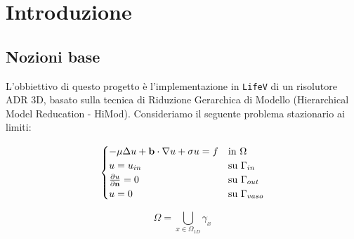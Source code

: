\chapter{Introduzione}
\section{Nozioni base}

L'obbiettivo di questo progetto \`e l'implementazione in \texttt{LifeV} di un risolutore ADR 3D, basato sulla tecnica di Riduzione Gerarchica di Modello (Hierarchical Model Reducation - HiMod). Consideriamo il seguente problema stazionario ai limiti:

\begin{equation}
\label{eq: problema forte}
\begin{cases}
-\mu\Delta u + \mathbf{b}\cdot \nabla u + \sigma u = f & \text{in $\Omega$}\\
u=u_{in} & \text{su $\Gamma_{in}$}\\
\frac{\partial u}{\partial \mathbf{n}}=0 & \text{su $\Gamma_{out}$ }\\
u=0 & \text{su $\Gamma _{vaso}$} \\
\end{cases}
\end{equation}


\begin{equation}
\label{eq:volume ridotto}
\Omega=\bigcup_{x\in \Omega_{1D}}\gamma_x
\end{equation}

\begin{center}
\end{center}

